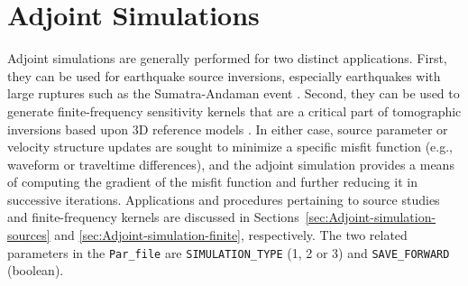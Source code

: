 \documentclass[oneside,english]{book}
\newcommand{\nchunks}{\mbox{\texttt{NCHUNKS}}}
\begin{document}
%
%
%
%
%



\chapter{\label{cha:Adjoint-Simulations}Adjoint Simulations}

Adjoint simulations are generally performed for two distinct applications.
First, they can be used for earthquake source inversions, especially
earthquakes with large ruptures such as the Sumatra-Andaman event
\citep{LayKanamoriAmmon2005,AmmonJiThio2005,ParkSongTromp2005}. Second,
they can be used to generate finite-frequency sensitivity kernels
that are a critical part of tomographic inversions based upon 3D reference
models \citep{TrTaLi05,LiTr06,TrKoLi08,LiTr08}. In either case, source
parameter or velocity structure updates are sought to minimize a specific
misfit function (e.g., waveform or traveltime differences), and the
adjoint simulation provides a means of computing the gradient of the
misfit function and further reducing it in successive iterations.
Applications and procedures pertaining to source studies and finite-frequency
kernels are discussed in Sections~\ref{sec:Adjoint-simulation-sources}
and \ref{sec:Adjoint-simulation-finite}, respectively. The two related
parameters in the \texttt{Par\_file} are \texttt{SIMULATION\_TYPE}
(1, 2 or 3) and \texttt{SAVE\_FORWARD} (boolean).
\end{document}
